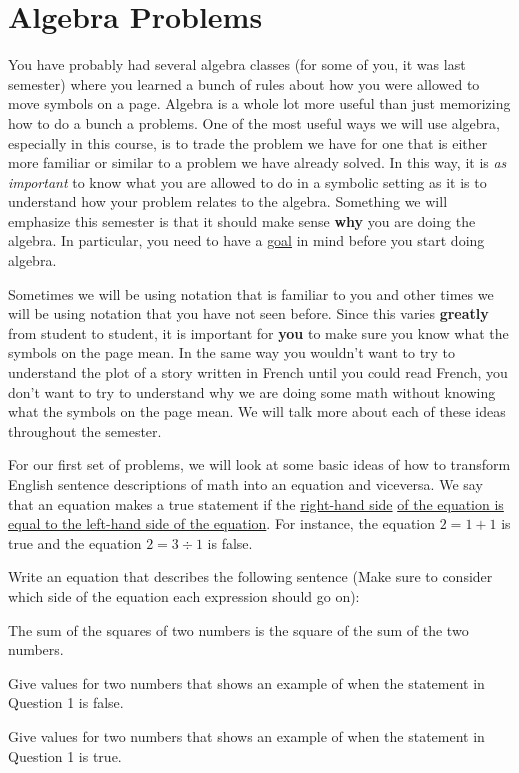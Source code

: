 \section{Algebra Problems}
You have probably had several algebra classes (for some of you, it was last semester) where you learned a bunch of rules about how you were allowed to move symbols on a page. Algebra is a whole lot more useful than just memorizing how to do a bunch a problems. One of the most useful ways we will use algebra, especially in this course, is to trade the problem we have for one that is either more familiar or similar to a problem we have already solved. In this way, it is \emph{as important} to know what you are allowed to do in a symbolic setting as it is to understand how your problem relates to the algebra. Something we will emphasize this semester is that it should make sense \textbf{why} you are doing the algebra. In particular, you need to have a \underline{goal} in mind before you start doing algebra.

Sometimes we will be using notation that is familiar to you and other times we will be using notation that you have not seen before. Since this varies \textbf{greatly} from student to student, it is important for \textbf{you} to make sure you know what the symbols on the page mean. In the same way you wouldn't want to try to understand the plot of a story written in French until you could read French, you don't want to try to understand why we are doing some math without knowing what the symbols on the page mean. We will talk more about each of these ideas throughout the semester.


For our first set of problems, we will look at some basic ideas of how to transform English sentence descriptions of math into an equation and viceversa. We say that an equation makes a true statement if the \underline{right-hand side} \underline{of the equation is equal to the left-hand side of the equation}. For instance, the equation $2=1+1$ is true and the equation $2=3 \div 1$ is false.

\bq Write an equation that describes the following sentence (Make sure to consider which side of the equation each expression should go on):

The sum of the squares of two numbers is the square of the sum of the two numbers.

\eq

\bq \be
\item Give values for two numbers that shows an example of when the statement in Question 1 is false.
\item Give values for two numbers that shows an example of when the statement in Question 1 is true.
\ee \eq

